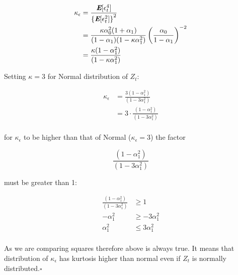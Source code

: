 \begin{solution}

\begin{equation}
\begin{aligned}
\kappa_{\epsilon} & = \frac{\textbf{\em E}[\epsilon_t^4]}{\left\{\textbf{\em E}[\epsilon_t^2]\right\}^2} \\
								  & = \frac{\kappa\alpha_0^2(1 + \alpha_1)}{(1 - \alpha_1)(1 - \kappa\alpha_1^2)} \left(\frac{\alpha_0}{1 - \alpha_1}\right)^{-2} \\
									& = \frac{\kappa(1 - \alpha_1^2)}{(1 - \kappa\alpha_1^2)} \\								
\end{aligned}
\end{equation}

Setting $\kappa = 3$ for Normal distribution of $Z_t$:

\begin{equation}
\begin{aligned}
\kappa_{\epsilon} & = \frac{3(1 - \alpha_1^2)}{(1 - 3\alpha_1^2)} \\
									& = 3 \cdot \frac{(1 - \alpha_1^2)}{(1 - 3\alpha_1^2)} \\
\end{aligned}
\end{equation}

for $\kappa_{\epsilon}$ to be higher than that of Normal ($\kappa_{\epsilon} = 3$) the factor

\begin{equation}
\nonumber
\frac{(1 - \alpha_1^2)}{(1 - 3\alpha_1^2)} 
\end{equation}

must be greater than 1:

\begin{equation}
\begin{aligned}
\frac{(1 - \alpha_1^2)}{(1 - 3\alpha_1^2)} & \geq 1 \\
                              - \alpha_1^2 & \geq - 3\alpha_1^2 \\
															  \alpha_1^2 & \leq   3\alpha_1^2 \\
\end{aligned}
\end{equation}

As we are comparing squares therefore above is always true. 
It means that distribution of $\kappa_{\epsilon}$ has kurtosis higher than normal even if $Z_t$ is normally distributed.$\square$

\end{solution}
